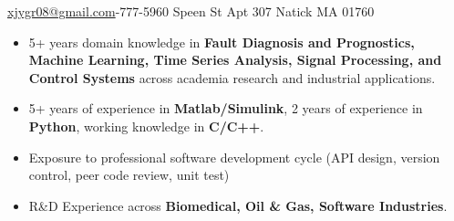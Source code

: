\documentclass[10pt,a4paper]{article}
\begin{document}
\sloppy  %



\nobreakvspace{0.3em}  %

\noindent\href{mailto:xjygr08@gmail.com}{xjygr08@gmail.com}-777-5960 Speen St Apt 307\sbull
Natick\sbull
MA 01760

\spacedhrule{0.5em}{-0.8em}  %
\begin{itemize}
\setlength{\itemsep}{0.1em}
\item 5+ years domain knowledge in \textbf{Fault Diagnosis and Prognostics, Machine Learning, Time Series Analysis, Signal Processing, and Control Systems} across academia research and industrial applications. 
\item 5+ years of experience in \textbf{Matlab/Simulink}, 2 years of experience
  in \textbf{Python}, working knowledge in
  \textbf{C/C++}.
 \item Exposure to professional software development cycle (API design, version control, peer code review, unit test) 
\item  R\&D Experience across \textbf{Biomedical, Oil \& Gas, Software Industries}.
\end{itemize}


\end{document}
